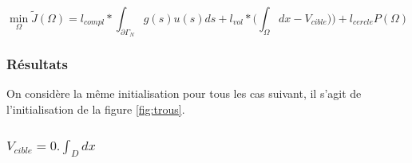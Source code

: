 \documentclass[11pt,a4paper]{article}
\begin{document}
\begin{equation}
\label{eq:objFunction2}
\min_{\Omega}\tilde{J}(\Omega)=l_{compl}*\int_{\partial\Gamma_N}g(s)u(s)ds + l_{vol}*\Big(\int_{\Omega}dx-V_{cible})\Big)+l_{cercle}P(\Omega)
\end{equation}



\subsubsection*{Résultats}


On considère la même initialisation pour tous les cas suivant, il s'agit de l'initialisation de la figure \ref{fig:trous}.

\subsubsection*{$V_{cible}=0.\int_D dx$}
\end{document}
